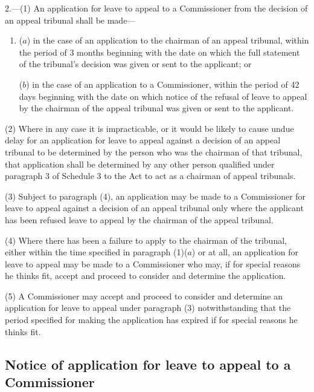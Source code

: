 \documentclass[12pt,a4paper]{article}
\begin{document}
2.—(1) An application for leave to appeal to a Commissioner from the decision of an appeal tribunal shall be made—
\begin{enumerate}\item[]
($a$) in the case of an application to the chairman of an appeal tribunal, within the period of 3 months beginning with the date on which 
the full statement of the tribunal’s decision  %
was given or sent to the applicant; or

($b$) in the case of an application to a Commissioner, within the period of 42 days beginning with the date on which notice of the refusal of leave to appeal by the chairman of the appeal tribunal was given or sent to the applicant.
\end{enumerate}

(2) Where in any case it is impracticable, or it would be likely to cause undue delay for an application for leave to appeal against a decision of an appeal tribunal to be determined by the person who was the chairman of that tribunal, that application shall be determined by any other person qualified under paragraph 3 of Schedule 3 to the Act to act as a chairman of appeal tribunals.

(3) Subject to paragraph (4), an application may be made to a Commissioner for leave to appeal against a decision of an appeal tribunal only where the applicant has been refused leave to appeal by the chairman of the appeal tribunal.

(4) Where there has been a failure to apply to the chairman of the tribunal, either within the time specified in paragraph (1)($a$) or at all, an application for leave to appeal may be made to a Commissioner who may, if for special reasons he thinks fit, accept and proceed to consider and determine the application.

(5) A Commissioner may accept and proceed to consider and determine an application for leave to appeal under paragraph (3) notwithstanding that the period specified for making the application has expired if for special reasons he thinks fit.


\subsection[3. Notice of application for leave to appeal to a Commissioner]{Notice of application for leave to appeal to a Commissioner}
\end{document}
